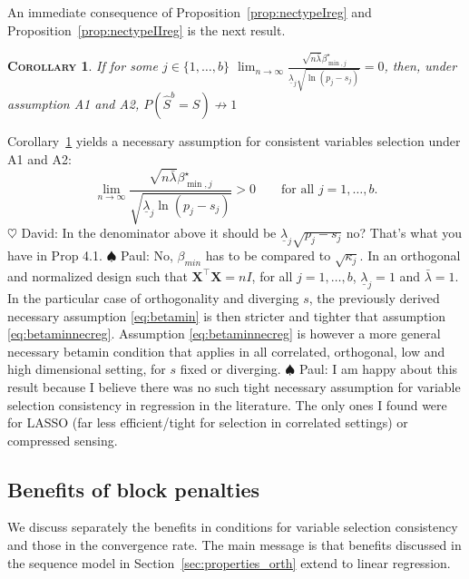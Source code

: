 \documentclass[aos]{imsart}
\theoremstyle{plain}
\newtheorem{cor}[thm]{\textsc{Corollary}}
\newcommand{\david}[1]{{\small{\color{blue} \sf $\heartsuit$ David: #1}}}
\newcommand{\paul}[1]{{\small{\color{green} \sf $\spadesuit$ Paul: #1}}}
\newcommand{\bs}{\boldsymbol}
\begin{document}
An immediate consequence of Proposition~\ref{prop:nectypeIreg} and Proposition~\ref{prop:nectypeIIreg} is the next result.
\begin{cor}\label{cor:necrecovreg}
    If for some $j\in\{1,\ldots,b\}$   $\lim_{n\to\infty}\frac{\sqrt{n\bar{\lambda}}\beta_{\min,j}^{\star}}{\underline{\lambda}_j\sqrt{\ln(p_j-s_j)}} = 0$, then, under assumption A1 and A2,  $P(\hat{S}^b=S)\not\to 1$
\end{cor}
Corollary~\ref{cor:necrecovreg} yields a necessary assumption for consistent variables selection under A1 and A2:
\begin{equation}\label{eq:betaminnecreg}
\lim_{n\to\infty}\frac{\sqrt{n\bar{\lambda}}\beta_{\min,j}^{\star}}{\sqrt{\underline{\lambda}_j\ln(p_j-s_j)}} > 0\qquad\mbox{for all }j=1,\ldots,b.
\end{equation}
\david{In the denominator above it should be $\underline{\lambda}_j \sqrt{p_j-s_j}$ no? That's what you have in Prop 4.1.}\paul{No, $\beta_{min}$ has to be compared to $\sqrt{\kappa_j}$.}
In an orthogonal and normalized design such that $\bs X^{\top} \bs X=nI$, for all $j=1,\ldots,b$, $\underline{\lambda}_j=1$ and $\bar{\lambda}=1$. In the particular case of orthogonality and diverging $s$, the previously derived necessary assumption \eqref{eq:betamin} is then stricter and tighter that assumption \eqref{eq:betaminnecreg}. Assumption \eqref{eq:betaminnecreg} is however a more general necessary betamin condition that applies in all correlated, orthogonal, low and high dimensional setting, for $s$ fixed or diverging. \paul{I am happy about this result because I believe there was no such tight necessary assumption for variable selection consistency in regression in the literature. The only ones I found were for LASSO (far less efficient/tight for selection in correlated settings) or compressed sensing}.


\subsection{Benefits of block penalties}
\label{ssec:regression_gains}

We discuss separately the benefits in conditions for variable selection consistency and those in the convergence rate. The main message
is that benefits discussed in the sequence model in Section~\ref{sec:properties_orth} extend to linear regression. 
\bigskip
\end{document}

